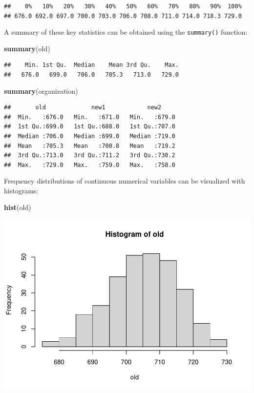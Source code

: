 \documentclass[
]{article}
\newenvironment{Shaded}{\begin{snugshade}}{\end{snugshade}}
\newcommand{\FunctionTok}[1]{\textcolor[rgb]{0.13,0.29,0.53}{\textbf{#1}}}
\newcommand{\NormalTok}[1]{#1}
\begin{document}
\begin{verbatim}
##    0%   10%   20%   30%   40%   50%   60%   70%   80%   90%  100% 
## 676.0 692.0 697.0 700.0 703.0 706.0 708.0 711.0 714.0 718.3 729.0
\end{verbatim}

A summary of these key statistics can be obtained using the
\texttt{summary()} function:

\begin{Shaded}
\begin{Highlighting}[]
\FunctionTok{summary}\NormalTok{(old)}
\end{Highlighting}
\end{Shaded}

\begin{verbatim}
##    Min. 1st Qu.  Median    Mean 3rd Qu.    Max. 
##   676.0   699.0   706.0   705.3   713.0   729.0
\end{verbatim}

\begin{Shaded}
\begin{Highlighting}[]
\FunctionTok{summary}\NormalTok{(organization)}
\end{Highlighting}
\end{Shaded}

\begin{verbatim}
##       old             new1            new2      
##  Min.   :676.0   Min.   :671.0   Min.   :679.0  
##  1st Qu.:699.0   1st Qu.:688.0   1st Qu.:707.0  
##  Median :706.0   Median :699.0   Median :719.0  
##  Mean   :705.3   Mean   :700.8   Mean   :719.2  
##  3rd Qu.:713.0   3rd Qu.:711.2   3rd Qu.:730.2  
##  Max.   :729.0   Max.   :759.0   Max.   :758.0
\end{verbatim}

Frequency distributions of continuous numerical variables can be
visualized with histograms:

\begin{Shaded}
\begin{Highlighting}[]
\FunctionTok{hist}\NormalTok{(old)}
\end{Highlighting}
\end{Shaded}

\includegraphics{EDA_files/figure-latex/unnamed-chunk-16-1.pdf}
\end{document}
